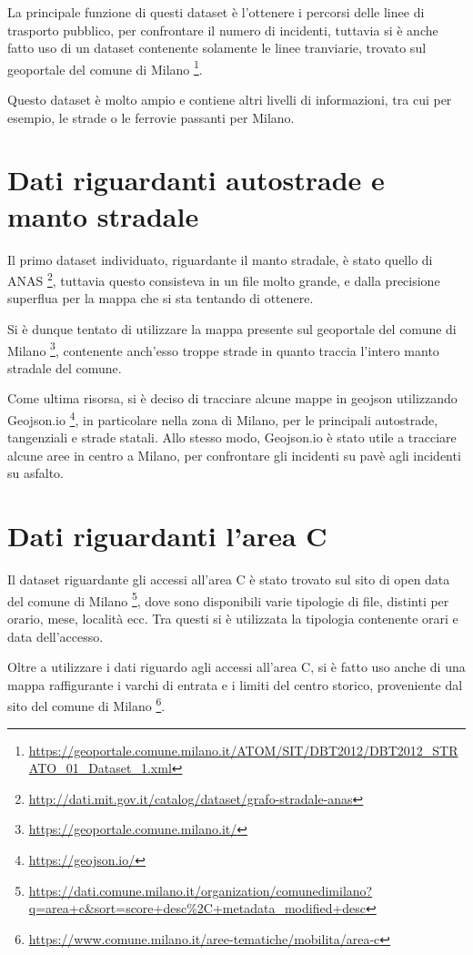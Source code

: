 \documentclass[a4paper]{report}
\begin{document}
La principale funzione di questi dataset è l'ottenere i percorsi delle linee di trasporto pubblico, 
per confrontare il numero di incidenti, tuttavia si è anche fatto uso di un dataset contenente 
solamente le linee tranviarie, trovato sul geoportale del comune di Milano
\footnote{\url{https://geoportale.comune.milano.it/ATOM/SIT/DBT2012/DBT2012_STRATO_01_Dataset_1.xml}}.

Questo dataset è molto ampio e contiene altri livelli di informazioni, tra cui per esempio, 
le strade o le ferrovie passanti per Milano. 

\section{Dati riguardanti autostrade e manto stradale}

Il primo dataset individuato, riguardante il manto  stradale, è stato quello di ANAS
\footnote{\url{http://dati.mit.gov.it/catalog/dataset/grafo-stradale-anas}}, 
tuttavia questo consisteva in un file molto grande, e dalla precisione superflua per 
la mappa che si sta tentando di ottenere.

Si è dunque tentato di utilizzare la mappa presente sul geoportale del comune di Milano
\footnote{\url{https://geoportale.comune.milano.it/}}, 
contenente anch'esso troppe strade in quanto traccia l'intero manto stradale del comune.

Come ultima risorsa, si è deciso di tracciare alcune mappe in geojson utilizzando Geojson.io
\footnote{\url{https://geojson.io/}}, in particolare nella zona di Milano, per le principali 
autostrade, tangenziali e strade statali. 
Allo stesso modo, Geojson.io è stato utile a tracciare alcune aree in centro a Milano, per confrontare 
gli incidenti su pavè agli incidenti su asfalto.

\section{Dati riguardanti l'area C}

Il dataset riguardante gli accessi all'area C è stato trovato sul sito di open data del 
comune di Milano
\footnote{\url{https://dati.comune.milano.it/organization/comunedimilano?q=area+c&sort=score+desc\%2C+metadata_modified+desc}}, 
dove sono disponibili varie tipologie di file, 
distinti per orario, mese, località ecc. 
Tra questi si è utilizzata la tipologia contenente orari e data dell'accesso.

Oltre a utilizzare i dati riguardo agli accessi all'area C, si è fatto uso anche di una mappa 
raffigurante i varchi di entrata e i limiti del centro storico, 
proveniente dal sito del comune di Milano
\footnote{\url{https://www.comune.milano.it/aree-tematiche/mobilita/area-c}}.
\end{document}
